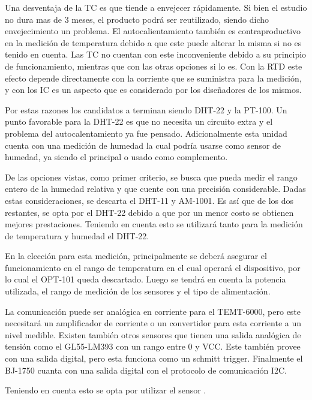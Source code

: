 Una desventaja de la TC es que tiende a envejecer rápidamente. Si bien el estudio no dura mas de 3 meses, el producto podrá ser reutilizado, siendo dicho envejecimiento un problema. El autocalientamiento también es contraproductivo en la medición de temperatura debido a que este puede alterar la misma si no es tenido en cuenta. Las TC no cuentan con este inconveniente debido a su principio de funcionamiento, mientras que con las otras opciones si lo es. Con la RTD este efecto depende directamente con la corriente que se suministra para la medición, y con los IC es un aspecto que es considerado por los diseñadores de los mismos.

Por estas razones los candidatos a terminan siendo DHT-22 y la PT-100. Un punto favorable para la DHT-22 es que no necesita un circuito extra y el problema del autocalentamiento ya fue pensado. Adicionalmente esta unidad cuenta con una medición de humedad la cual podría usarse como sensor de humedad, ya siendo el principal o usado como complemento.

De las opciones vistas, como primer criterio, se busca que pueda medir el rango entero de la humedad relativa y que cuente con una precisión considerable. Dadas estas consideraciones, se descarta el DHT-11 y AM-1001. Es así que de los dos restantes, se opta por el DHT-22 debido a que por un menor costo se obtienen mejores prestaciones. Teniendo en cuenta esto se utilizará tanto para la medición de temperatura y humedad el DHT-22.

En la elección para esta medición, principalmente se deberá asegurar el funcionamiento en el rango de temperatura en el cual operará el dispositivo, por lo cual el OPT-101 queda descartado. Luego se tendrá en cuenta la potencia utilizada, el rango de medición de los sensores y el tipo de alimentación.

La comunicación puede ser analógica en corriente para el TEMT-6000, pero este necesitará un amplificador de corriente o un convertidor para esta corriente a un nivel medible. Existen también otros sensores que tienen una salida analógica de tensión como el GL55-LM393 con un rango entre 0 y VCC. Este también provee con una salida digital, pero esta funciona como un schmitt trigger. Finalmente el BJ-1750 cuanta con una salida digital con el protocolo de comunicación I2C.

Teniendo en cuenta esto se opta por utilizar el sensor \TBD.


